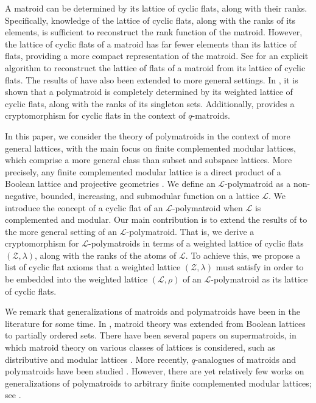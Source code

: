 \documentclass[a4paper,11pt,reqno]{article}
\theoremstyle{definition}
\newcommand{\mL}{\mathcal{L}}
\newcommand{\mZ}{\mathcal{Z}}
\begin{document}
A matroid can be determined by its lattice of cyclic flats, along with their ranks. Specifically, knowledge of the lattice of cyclic flats, along with the ranks of its elements, is sufficient to reconstruct the rank function of the matroid. However, the lattice of cyclic flats of a matroid has far fewer elements than its lattice of flats, providing a more compact representation of the matroid. See \cite{fghw} for an explicit algorithm to reconstruct the lattice of flats of a matroid from its lattice of cyclic flats. The results of \cite{bonin_demier,sims} have also been extended to more general settings. In \cite{Csirm20}, it is shown that a polymatroid is completely determined by its weighted lattice of cyclic flats, along with the ranks of its singleton sets. Additionally, \cite{AlfByr22} provides a cryptomorphism for cyclic flats in the context of $q$-matroids.

In this paper, we consider the theory of polymatroids in the context of more general lattices, with the main focus on finite complemented modular lattices, which comprise a more general class than subset and subspace lattices. More precisely, any finite complemented modular lattice is a direct product of a Boolean lattice and projective geometries \cite[Chapter 4, Section 7]{birkhoff_lattice}. We define an $\mL$-polymatroid as a non-negative, bounded, increasing, and submodular function on a lattice $\mL$. We introduce the concept of a cyclic flat of an $\mL$-polymatroid when $\mathcal{L}$ is complemented and modular. Our main contribution is to extend the results of \cite{AlfByr22,bonin_demier,Csirm20} to the more general setting of an $\mL$-polymatroid. That is, we derive a cryptomorphism for $\mL$-polymatroids in terms of a weighted lattice of cyclic flats $(\mZ,\lambda)$, along with the ranks of the atoms of $\mL$. To achieve this, we propose a list of cyclic flat axioms that a weighted lattice $(\mZ,\lambda)$ must satisfy in order to be embedded into the weighted lattice $(\mL,\rho)$ of an $\mL$-polymatroid as its lattice of cyclic flats.  

We remark that generalizations of matroids and polymatroids have been in the literature for some time. In \cite{faigle}, matroid theory was extended from Boolean lattices to partially ordered sets. There have been several papers on supermatroids, in which matroid theory on various classes of lattices is considered, such as distributive and modular lattices \cite{Dunstan,MAEHARA_supermat,tardos_supermat,WILD_supermat}. More recently, $q$-analogues of matroids and polymatroids have been studied \cite{JP18,BCJ_JCTB,bcij,gpr_q_complex,gorla2019rank,shiromoto19}. 
However, there are yet relatively few works on generalizations of polymatroids to arbitrary finite complemented modular lattices; see \cite{alfarano2023critical,GorlaSalizz_Latroid,Vertigan2004Latroids}. 
\end{document}

